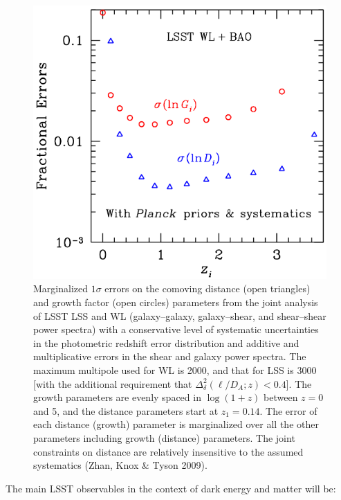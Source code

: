 \begin{figure}
\includegraphics[width=1.0\hsize,clip]{dges.pdf}
\caption{Marginalized $1\sigma$ errors on the comoving distance
(open triangles) and growth factor (open circles) parameters from
the joint analysis of LSST LSS and WL (galaxy--galaxy, galaxy--shear,
and shear--shear power spectra) with a
conservative level of systematic uncertainties in the photometric redshift error
distribution and additive and multiplicative errors in the shear and
galaxy power spectra. The maximum multipole used for WL is
2000, and that for LSS is 3000 [with the additional requirement that
$\Delta_\delta^2(\ell/D_{A};z) < 0.4$].
The growth parameters
are evenly spaced in
$\log(1+z)$ between $z = 0$ and 5, and the distance parameters
start at $z_1 = 0.14$.
The error of each distance (growth) parameter is marginalized
over all the other parameters including growth (distance) parameters. The joint constraints on
distance are relatively insensitive to the assumed systematics
(Zhan, Knox \& Tyson 2009).}
\label{Fig:bao2}
\end{figure}


The main LSST observables in the context of dark energy and matter will be:

